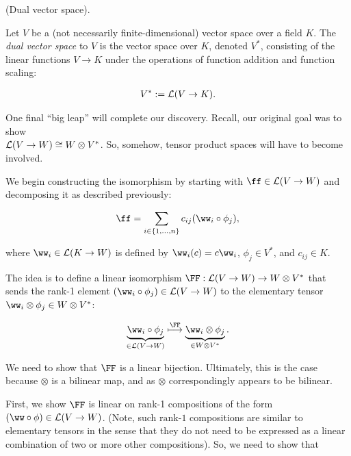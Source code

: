 \begin{defn}
\label{ch::motivated_intro::defn::dual_space_1}
    (Dual vector space).
    
    Let $V$ be a (not necessarily finite-dimensional) vector space over a field $K$. The \textit{dual vector space} to $V$ is the vector space over $K$, denoted $V^*$, consisting of the linear functions $V \rightarrow K$ under the operations of function addition and function scaling:
    
    \begin{align*}
        V^* := \mathcal{L}(V \rightarrow K).
    \end{align*}
\end{defn}

\vspace{.5cm}

One final ``big leap'' will complete our discovery. Recall, our original goal was to show \\ ${\mathcal{L}(V \rightarrow W) \cong W \otimes V^*}$. So, somehow, tensor product spaces will have to become involved.

We begin constructing the isomorphism by starting with $\ff \in \LLLL(V \rightarrow W)$ and decomposing it as described previously:

\begin{align*}
    \ff = \sum_{\substack{i \in \{1, ..., n\}}} c_{ij} (\ww_i \circ \phi_j),
\end{align*}

where $\ww_i \in \LLLL(K \rightarrow W)$ is defined by $\ww_i(c) = c \ww_i$, $\phi_j \in V^*$, and $c_{ij} \in K$.

The idea is to define a linear isomorphism $\FF:\LLLL(V \rightarrow W) \rightarrow W \otimes V^*$ that sends the rank-1 element ${(\ww_i \circ \phi_j) \in \LLLL(V \rightarrow W)}$ to the elementary tensor $\ww_i \otimes \phi_j \in W \otimes V^*$:

\begin{align*}
    \underbrace{\ww_i \circ \phi_j}_{\in \LLLL(V \rightarrow W)} \overset{\FF}{\longmapsto} \underbrace{\ww_i \otimes \phi_j}_{\in W \otimes V^*}.
\end{align*}

We need to show that $\FF$ is a linear bijection. Ultimately, this is the case because $\otimes$ is a bilinear map, and as $\otimes$ correspondingly appears to be bilinear.

First, we show $\FF$ is linear on rank-1 compositions of the form $(\ww \circ \phi) \in \LLLL(V \rightarrow W)$. (Note, such ${\text{rank-1}}$ compositions are similar to elementary tensors in the sense that they do not need to be expressed as a linear combination of two or more other compositions). So, we need to show that

